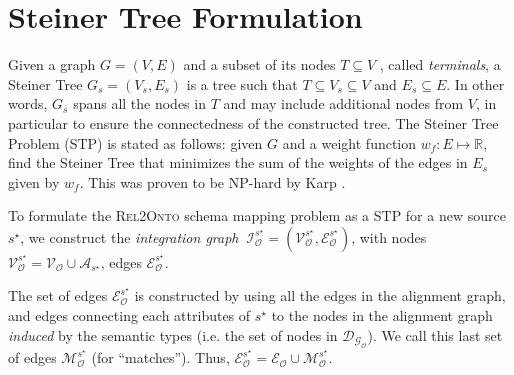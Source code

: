 \documentclass[letterpaper]{article} %
\newcommand{\authornote}[3]{
  {\fbox{\sc 
  #1}:$\blacktriangleright$\textcolor{#2}{\small{#3}}$\blacktriangleleft$}%
}
\newcommand{\ddg}[1]{\authornote{DDG}{blue}{#1}}
\newcommand{\npr}[1]{\authornote{NPR}{orange}{#1}}
\newcommand{\relonto}{\textsc{Rel2Onto}}
\begin{document}
% 
 

\section{Steiner Tree Formulation \label{SEC:STP}}

Given a graph $G =
(V, E)$ and a subset of its nodes $T \subseteq V$ , called \emph{terminals}, a 
Steiner Tree $G_s = (V_s, E_s )$ is a tree such that $T \subseteq V_s \subseteq 
V$ and $E_s \subseteq E$. In other words, $G_s$ spans all the nodes in $T$ and 
may include additional nodes from $V$, in particular to ensure the 
connectedness of the constructed tree. The Steiner Tree Problem 
(STP) is stated as follows: given $G$ and a weight function $w_f : E 
\mapsto \mathbb{R}$, find the Steiner Tree that minimizes the sum of the 
weights of the edges in $E_s$ given by $w_f$. This was proven to be NP-hard 
by Karp \cite{Karp1972}.

To formulate the \relonto{} schema mapping problem as a STP for a new source 
$s^\star$, we construct the 
\emph{integration graph} $~\mathcal{I}_\mathcal{O}^{s^\star} = 
(\mathcal{V}_\mathcal{O}^{s^\star},\mathcal{E}_\mathcal{O}^{s^\star})$, with 
nodes $\mathcal{V}_\mathcal{O}^{s^\star} = \mathcal{V_O} \cup 
\mathcal{A}_{s^\star}$, 
edges $\mathcal{E}_\mathcal{O}^{s^\star}$.

The set of edges $\mathcal{E}_\mathcal{O}^{s^\star}$ is constructed by using 
all the edges in the alignment 
graph, and edges connecting each attributes of $s^\star$ to the nodes in the 
alignment graph \emph{induced} by the semantic types (i.e. the set of nodes in 
$\mathcal{D_{G_O}}$). We call this last set 
of edges $\mathcal{M}_\mathcal{O}^{s^\star}$ (for ``matches''). Thus, 
$\mathcal{E}_\mathcal{O}^{s^\star} = 
\mathcal{E_O} \cup \mathcal{M}_\mathcal{O}^{s^\star}$.
\end{document}
